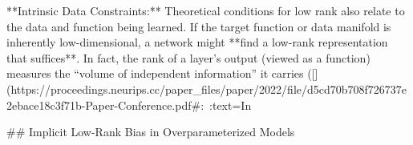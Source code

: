 **Intrinsic Data Constraints:** Theoretical conditions for low rank also relate to the data and function being learned. If the target function or data manifold is inherently low-dimensional, a network might **find a low-rank representation that suffices**. In fact, the rank of a layer’s output (viewed as a function) measures the “volume of independent information” it carries ([](https://proceedings.neurips.cc/paper_files/paper/2022/file/d5cd70b708f726737e2ebace18c3f71b-Paper-Conference.pdf#:~:text=In%

## Implicit Low-Rank Bias in Overparameterized Models

